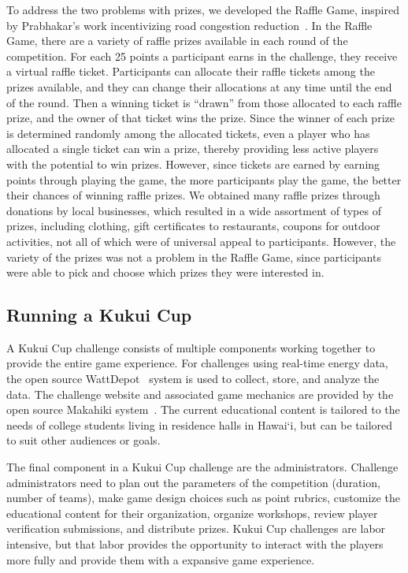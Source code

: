 \documentclass[10pt, conference, compsocconf]{IEEEtran-old}
\newcommand{\Hawaii}{Hawai`i\xspace}
\begin{document}
To address the two problems with prizes, we developed the Raffle Game, inspired by Prabhakar's work incentivizing road congestion reduction~\cite{Merugu2009}. In the Raffle Game, there are a variety of raffle prizes available in each round of the competition. For each 25 points a participant earns in the challenge, they receive a virtual raffle ticket. Participants can allocate their raffle tickets among the prizes available, and they can change their allocations at any time until the end of the round. Then a winning ticket is ``drawn'' from those allocated to each raffle prize, and the owner of that ticket wins the prize. Since the winner of each prize is determined randomly among the allocated tickets, even a player who has allocated a single ticket can win a prize, thereby providing less active players with the potential to win prizes. However, since tickets are earned by earning points through playing the game, the more participants play the game, the better their chances of winning raffle prizes. We obtained many raffle prizes through donations by local businesses, which resulted in a wide assortment of types of prizes, including clothing, gift certificates to restaurants, coupons for outdoor activities, not all of which were of universal appeal to participants. However, the variety of the prizes was not a problem in the Raffle Game, since participants were able to pick and choose which prizes they were interested in.

\subsection{Running a Kukui Cup}

A Kukui Cup challenge consists of multiple components working together to provide the entire game experience. For challenges using real-time energy data, the open source WattDepot~\cite{csdl2-10-05} system is used to collect, store, and analyze the data. The challenge website and associated game mechanics are provided by the open source Makahiki system~\cite{csdl2-11-01, csdl2-12-06}. The current educational content is tailored to the needs of college students living in residence halls in \Hawaii, but can be tailored to suit other audiences or goals.

The final component in a Kukui Cup challenge are the administrators. Challenge administrators need to plan out the parameters of the competition (duration, number of teams), make game design choices such as point rubrics, customize the educational content for their organization, organize workshops, review player verification submissions, and distribute prizes. Kukui Cup challenges are labor intensive, but that labor provides the opportunity to interact with the players more fully and provide them with a expansive game experience.
\end{document}
